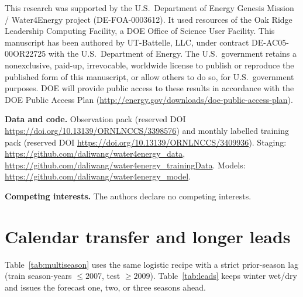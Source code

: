 \documentclass{article}
\begin{document}
\begin{ack}
This research was supported by the U.S.\ Department of Energy Genesis Mission / Water4Energy project (DE-FOA-0003612). It used resources of the Oak Ridge Leadership Computing Facility, a DOE Office of Science User Facility. This manuscript has been authored by UT-Battelle, LLC, under contract DE-AC05-00OR22725 with the U.S.\ Department of Energy. The U.S.\ government retains a nonexclusive, paid-up, irrevocable, worldwide license to publish or reproduce the published form of this manuscript, or allow others to do so, for U.S.\ government purposes. DOE will provide public access to these results in accordance with the DOE Public Access Plan (\url{http://energy.gov/downloads/doe-public-access-plan}).

\textbf{Data and code.} Observation pack (reserved DOI \url{https://doi.org/10.13139/ORNLNCCS/3398576}) and monthly labelled training pack (reserved DOI \url{https://doi.org/10.13139/ORNLNCCS/3409936}). Staging: \url{https://github.com/daliwang/water4energy_data}, \url{https://github.com/daliwang/water4energy_trainingData}. Models: \url{https://github.com/daliwang/water4energy_model}.

\textbf{Competing interests.} The authors declare no competing interests.
\end{ack}

\appendix
\section{Calendar transfer and longer leads}
\label{app:bounds}

Table~\ref{tab:multiseason} uses the same logistic recipe with a strict prior-season lag (train season-years \(\le 2007\), test \(\ge 2009\)). Table~\ref{tab:leads} keeps winter wet/dry and issues the forecast one, two, or three seasons ahead.
\end{document}
